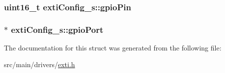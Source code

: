 \hypertarget{structextiConfig__s_ab9d8e1c9201223ef409639b4bf4b88ef}{
\subsubsection[{gpio\+Pin}]{\setlength{\rightskip}{0pt plus 5cm}uint16\+\_\+t exti\+Config\+\_\+s\+::gpio\+Pin}}\label{structextiConfig__s_ab9d8e1c9201223ef409639b4bf4b88ef}
\hypertarget{structextiConfig__s_a88136309a310e397f365662945aed6f7}{
\subsubsection[{gpio\+Port}]{$\ast$ exti\+Config\+\_\+s\+::gpio\+Port}}\label{structextiConfig__s_a88136309a310e397f365662945aed6f7}


The documentation for this struct was generated from the following file\+:\begin{DoxyCompactItemize}
\item 
src/main/drivers/\hyperlink{exti_8h}{exti.\+h}\end{DoxyCompactItemize}

